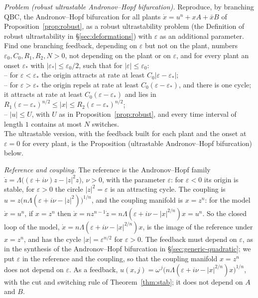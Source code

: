 \documentclass[11pt,reqno]{amsart}
\theoremstyle{plain}
\theoremstyle{definition}
\theoremstyle{remark}
\begin{document}
\begin{enumerate}
\emph{Problem (robust ultrastable Andronov--Hopf bifurcation).} Reproduce, by branching QBC, the Andronov--Hopf bifurcation for all plants $\dot x=u^{n}+xA+\bar xB$ of Proposition~\ref{prop:robust}, as a robust ultrastability problem (the Definition of robust ultrastability in \S\ref{sec:deformations}) with $\varepsilon$ as an additional parameter. Find one branching feedback, depending on $\varepsilon$ but not on the plant, numbers $\varepsilon_0,C_0,R_1,R_2,N>0$, not depending on the plant or on $\varepsilon$, and for every plant an onset $\varepsilon_*$ with $|\varepsilon_*|\le\varepsilon_0/2$, such that for $|\varepsilon|\le\varepsilon_0$:\\
-- for $\varepsilon<\varepsilon_*$ the origin attracts at rate at least $C_0|\varepsilon-\varepsilon_*|$;\\
-- for $\varepsilon>\varepsilon_*$ the origin repels at rate at least $C_0(\varepsilon-\varepsilon_*)$, and there is one cycle; it attracts at rate at least $C_0(\varepsilon-\varepsilon_*)$ and lies in $R_1(\varepsilon-\varepsilon_*)^{n/2}\le|x|\le R_2(\varepsilon-\varepsilon_*)^{n/2}$;\\
-- $|u|\le U$, with $U$ as in Proposition~\ref{prop:robust}, and every time interval of length $1$ contains at most $N$ switches.\\
The ultrastable version, with the feedback built for each plant and the onset at $\varepsilon=0$ for every plant, is the Proposition (ultrastable Andronov--Hopf bifurcation) below.

\emph{Reference and coupling.} The reference is the Andronov--Hopf family $\dot z=\Lambda\bigl((\varepsilon+i\nu)z-|z|^{2}z\bigr)$, $\nu>0$, with the parameter $\varepsilon$: for $\varepsilon<0$ its origin is stable, for $\varepsilon>0$ the circle $|z|^{2}=\varepsilon$ is an attracting cycle. The coupling is $u=z\bigl(n\Lambda(\varepsilon+i\nu-|z|^{2})\bigr)^{1/n}$, and the coupling manifold is $x=z^{n}$: for the model $\dot x=u^{n}$, if $x=z^{n}$ then $\dot x=nz^{n-1}\dot z=n\Lambda(\varepsilon+i\nu-|x|^{2/n})x=u^{n}$. So the closed loop of the model, $\dot x=n\Lambda(\varepsilon+i\nu-|x|^{2/n})x$, is the image of the reference under $x=z^{n}$, and has the cycle $|x|=\varepsilon^{n/2}$ for $\varepsilon>0$. The feedback must depend on $\varepsilon$, as in the synthesis of the Andronov--Hopf bifurcation in \S\ref{sec:generic-quadratic}; we put $\varepsilon$ in the reference and the coupling, so that the coupling manifold $x=z^{n}$ does not depend on $\varepsilon$. As a feedback, $u(x,j)=\omega^{\,j}\bigl(n\Lambda(\varepsilon+i\nu-|x|^{2/n})x\bigr)^{1/n}$, with the cut and switching rule of Theorem~\ref{thm:stab}; it does not depend on $A$ and $B$.


\end{enumerate}
\end{document}

